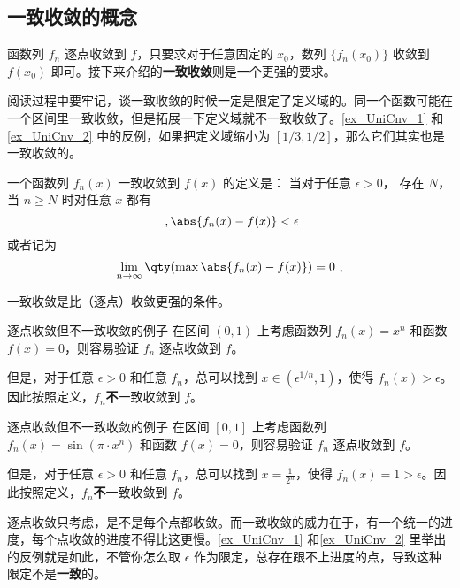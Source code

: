 

\subsection{一致收敛的概念}

函数列 $f_n$ 逐点收敛到 $f$，只要求对于任意固定的 $x_0$，数列 $\{f_n(x_0)\}$ 收敛到 $f(x_0)$ 即可。接下来介绍的\textbf{一致收敛}则是一个更强的要求。

阅读过程中要牢记，谈一致收敛的时候一定是限定了定义域的。同一个函数可能在一个区间里一致收敛，但是拓展一下定义域就不一致收敛了。\autoref{ex_UniCnv_1} 和\autoref{ex_UniCnv_2} 中的反例，如果把定义域缩小为 $[1/3, 1/2]$，那么它们其实也是一致收敛的。

一个函数列 $f_n(x)$ 一致收敛到 $f(x)$ 的定义是： 当对于任意 $\epsilon > 0$， 存在 $N$， 当 $n \geqslant N$ 时对任意 $x$ 都有
\begin{equation}\label{eq_UniCnv_1}~,
\abs{f_n(x) - f(x)} < \epsilon
\end{equation}
或者记为
\begin{equation}
\lim_{n\to\infty} \qty(\max \abs{f_n(x) - f(x)}) = 0~,
\end{equation}

一致收敛是比（逐点）收敛更强的条件。

\begin{example}{逐点收敛但不一致收敛的例子}\label{ex_UniCnv_1}
在区间 $(0, 1)$ 上考虑函数列 $f_n(x)=x^n$ 和函数 $f(x)=0$，则容易验证 $f_n$ 逐点收敛到 $f$。

但是，对于任意 $\epsilon>0$ 和任意 $f_n$，总可以找到 $x\in(\epsilon^{1/n}, 1)$，使得 $f_n(x)>\epsilon$。因此按照定义，$f_n$\textbf{不}一致收敛到 $f$。

\end{example}

\begin{example}{逐点收敛但不一致收敛的例子}\label{ex_UniCnv_2}
在区间 $[0, 1]$ 上考虑函数列 $f_n(x)=\sin(\pi\cdot x^n)$ 和函数 $f(x)=0$，则容易验证 $f_n$ 逐点收敛到 $f$。

但是，对于任意 $\epsilon>0$ 和任意 $f_n$，总可以找到 $x=\frac{1}{2^n}$，使得 $f_n(x)=1>\epsilon$。因此按照定义，$f_n$\textbf{不}一致收敛到 $f$。

\end{example}

逐点收敛只考虑，是不是每个点都收敛。而一致收敛的威力在于，有一个统一的进度，每个点收敛的进度不得比这更慢。\autoref{ex_UniCnv_1} 和\autoref{ex_UniCnv_2} 里举出的反例就是如此，不管你怎么取 $\epsilon$ 作为限定，总存在跟不上进度的点，导致这种限定不是\textbf{一致}的。

